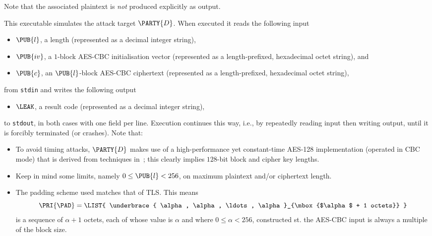 \documentclass[crop={false},multi={true},tikz={true}]{standalone}
\begin{document}
\noindent
Note that the associated  plaintext is {\em not} produced explicitly as
output.



This executable simulates the attack target $\PARTY{D}$.  When executed it 
reads the following input

\begin{itemize}
\item $\PUB{l}$,
      a  length
      (represented as a                       decimal integer string),
\item $\PUB{iv}$,
      a      ${1}$-block AES-CBC initialisation vector
      (represented as a  length-prefixed, hexadecimal octet   string),
      and
\item $\PUB{c}$,
      an $\PUB{l}$-block AES-CBC ciphertext
      (represented as a  length-prefixed, hexadecimal octet   string),
\end{itemize}

\noindent
from \lstinline[language={bash}]{stdin} and writes the following output

\begin{itemize}
\item $\LEAK$,
      a  result code
      (represented as a                       decimal integer string),
\end{itemize}

\noindent
to \lstinline[language={bash}]{stdout}, in both cases with one field per 
line.  Execution continues this way, i.e., by repeatedly reading input 
then writing output, until it is forcibly terminated (or crashes).  
Note that:

\begin{itemize}
\item To avoid timing attacks, $\PARTY{D}$ makes use of a high-performance
      yet constant-time AES-128 implementation (operated in CBC mode) that
      is derived from techniques in~\cite{SCALE:KasSch:09};
      this clearly implies $128$-bit block and cipher key lengths.  
\item Keep in mind some limits, namely $0 \leq \PUB{l} < 256$, on maximum
      plaintext and/or ciphertext length.
\item The padding scheme used matches that of TLS.  This means
      \[
      \PRI{\PAD} = \LIST{ \underbrace{ \alpha, \alpha, \ldots, \alpha }_{\mbox{$\alpha$ + 1 octets}} }
      \]
      is a sequence of $\alpha + 1$ octets, each of whose value is $\alpha$
      and where $0 \leq \alpha < 256$, constructed st. the AES-CBC input is
      always a multiple of the block size.
\end{itemize}
\end{document}
